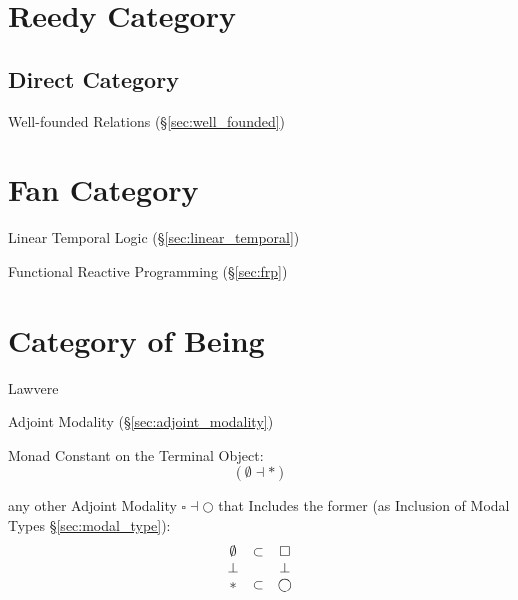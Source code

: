 \section{Reedy Category}\label{sec:reedy_category}




\subsection{Direct Category}\label{sec:direct_category}

Well-founded Relations (\S\ref{sec:well_founded})



\section{Fan Category}\label{sec:fan_category}


Linear Temporal Logic (\S\ref{sec:linear_temporal})

Functional Reactive Programming (\S\ref{sec:frp})



\section{Category of Being}\label{sec:category_of_being}

Lawvere

Adjoint Modality (\S\ref{sec:adjoint_modality})

Monad Constant on the Terminal Object:
\[
  (\emptyset \dashv *)
\]

any other Adjoint Modality $\square \dashv \bigcirc$ that Includes the
former (as Inclusion of Modal Types \S\ref{sec:modal_type}):
\[
  \begin{matrix}
    \emptyset & \subset & \square \\
    \bot & \empty & \bot \\
    * & \subset & \bigcirc
  \end{matrix}
\]
